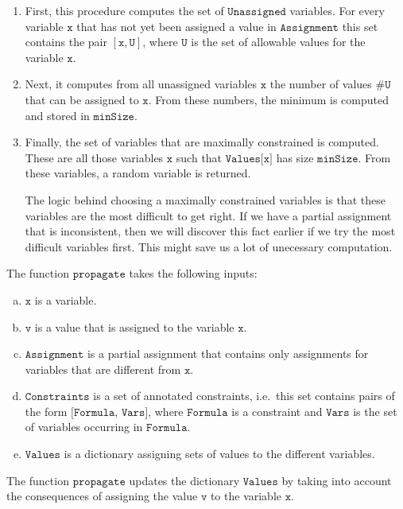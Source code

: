 \begin{enumerate}
\item First, this procedure computes the set of $\texttt{Unassigned}$ variables.  For every variable $\texttt{x}$ that
      has not yet been assigned a value in $\texttt{Assignment}$ this set contains the pair 
      $[\texttt{x}, \texttt{U}]$, where $\texttt{U}$ is the set of allowable values for the variable  $\texttt{x}$.
\item Next, it computes from all unassigned variables $\texttt{x}$ the number of values $\texttt{\#U}$ 
      that can be assigned to $\texttt{x}$.  From these numbers, the minimum is computed and stored in $\texttt{minSize}$.  
\item Finally, the set of variables that are maximally constrained is computed.  These are all those variables
      $\texttt{x}$ such that $\texttt{Values[x]}$ has size $\texttt{minSize}$.  From these variables, a random 
      variable is returned.
      
      The logic behind choosing a maximally constrained variables is that these variables are the most
      difficult to get right.  If we have a partial assignment that is inconsistent, then we will discover this
      fact earlier if we try the most difficult variables first.  This might save us a lot of unecessary
      computation. 
\end{enumerate}
The function $\texttt{propagate}$ takes the following inputs:
\begin{enumerate}[(a)]
\item $\texttt{x}$ is a variable.
\item $\texttt{v}$ is a value that is assigned to the variable $\texttt{x}$.
\item $\texttt{Assignment}$ is a partial assignment that contains only assignments for variables that are
      different from $\texttt{x}$.
\item $\texttt{Constraints}$ is a set of annotated constraints, i.e.~this set contains pairs of the form 
      $\texttt{[Formula, Vars]}$, where $\texttt{Formula}$ is a constraint and $\texttt{Vars}$ is the set of
      variables occurring in $\texttt{Formula}$.
\item $\texttt{Values}$ is a dictionary assigning sets of values to the different variables.
\end{enumerate}
The function $\texttt{propagate}$ updates the dictionary $\texttt{Values}$ by taking into account the
consequences of assigning the value $\texttt{v}$ to the variable $\texttt{x}$.
